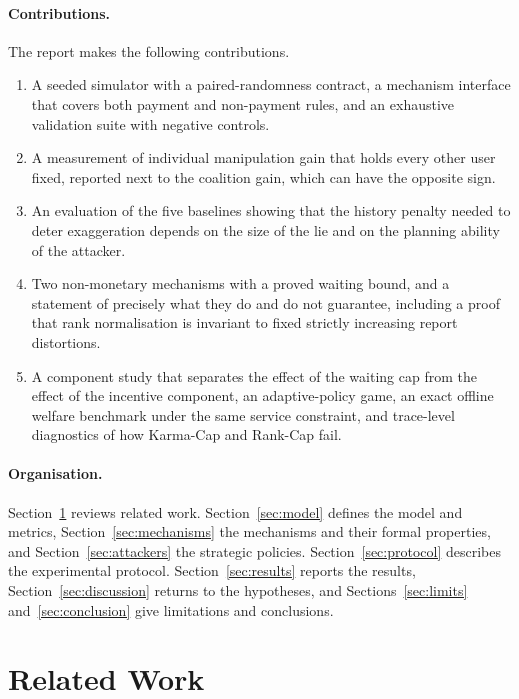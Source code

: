 \documentclass{article}
\theoremstyle{plain}
\theoremstyle{definition}
\begin{document}
\paragraph{Contributions.}
The report makes the following contributions.
\begin{enumerate}
\item A seeded simulator with a paired-randomness contract, a mechanism interface that covers both payment and non-payment rules, and an exhaustive validation suite with negative controls.
\item A measurement of individual manipulation gain that holds every other user fixed, reported next to the coalition gain, which can have the opposite sign.
\item An evaluation of the five baselines showing that the history penalty needed to deter exaggeration depends on the size of the lie and on the planning ability of the attacker.
\item Two non-monetary mechanisms with a proved waiting bound, and a statement of precisely what they do and do not guarantee, including a proof that rank normalisation is invariant to fixed strictly increasing report distortions.
\item A component study that separates the effect of the waiting cap from the effect of the incentive component, an adaptive-policy game, an exact offline welfare benchmark under the same service constraint, and trace-level diagnostics of how Karma-Cap and Rank-Cap fail.
\end{enumerate}

\paragraph{Organisation.}
Section~\ref{sec:related} reviews related work.
Section~\ref{sec:model} defines the model and metrics, Section~\ref{sec:mechanisms} the mechanisms and their formal properties, and Section~\ref{sec:attackers} the strategic policies.
Section~\ref{sec:protocol} describes the experimental protocol.
Section~\ref{sec:results} reports the results, Section~\ref{sec:discussion} returns to the hypotheses, and Sections~\ref{sec:limits} and~\ref{sec:conclusion} give limitations and conclusions.

\section{Related Work}
\label{sec:related}
\end{document}

